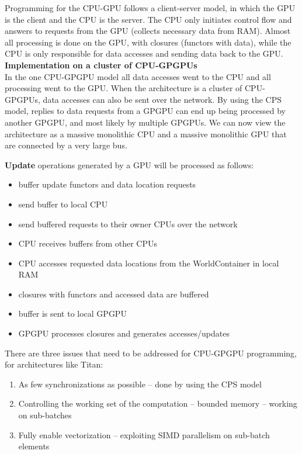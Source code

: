 \documentclass{article}
\begin{document}
\begin{enumerate}
Programming for the CPU-GPU follows a client-server model, in which the GPU is the client and
the CPU is the server. The CPU only initiates control flow and answers to requests from the
GPU (collects necessary data from RAM). Almost all processing is done on the GPU, 
with closures (functors with data), while the CPU is only responsible for data accesses and
sending data back to the GPU.\\

{\bf Implementation on a cluster of CPU-GPGPUs}\\

In the one CPU-GPGPU model all data accesses went to the CPU and all processing went 
to the GPU. When the architecture is a cluster of CPU-GPGPUs, data accesses can also
be sent over the network. By using the CPS model, replies to data requests from a GPGPU can
end up being processed by another GPGPU, and most likely by multiple GPGPUs. We can now
view the architecture as a massive monolithic CPU and a massive monolithic GPU that are
connected by a very large bus.

{\bf Update} operations generated by a GPU will be processed as follows:
\begin{itemize}
\item buffer update functors and data location requests
\item send buffer to local CPU
\item send buffered requests to their owner CPUs over the network
\item CPU receives buffers from other CPUs
\item CPU accesses requested data locations from the WorldContainer in local RAM
\item closures with functors and accessed data are buffered
\item buffer is sent to local GPGPU
\item GPGPU processes closures and generates accesses/updates
\end{itemize}

There are three issues that need to be addressed for CPU-GPGPU programming, for architectures
like Titan:
\begin{enumerate}
\item As few synchronizations as possible -- done by using the CPS model
\item Controlling the working set of the computation -- bounded memory -- working on sub-batches
\item Fully enable vectorization -- exploiting SIMD parallelism on sub-batch elements
\end{enumerate}


\end{enumerate}
\end{document}

